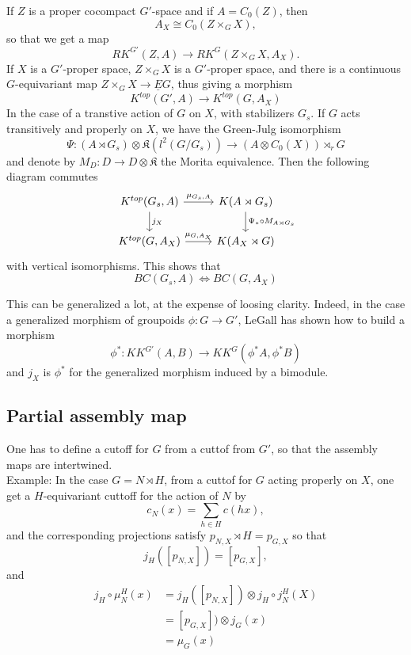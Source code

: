 If $Z$ is a proper cocompact $G'$-space and if $A=C_0(Z)$, then 
\[A_X \cong C_0(Z\times_G X ),\]
so that we get a map
\[RK^{G'}(Z, A) \rightarrow RK^G(Z\times_G X,A_X).\]
If $X$ is a $G'$-proper space, $Z\times_G X$ is a $G'$-proper space, and there is a continuous $G$-equivariant map $Z\times_G X \rightarrow \underline E G$, thus giving a morphism
\[ K^{top}(G',A) \rightarrow K^{top}(G,A_X)  \]
In the case of a transtive action of $G$ on $X$, with stabilizers $G_s$. If $G$ acts transitively and properly on $X$, we have the Green-Julg isomorphism 
\[\Psi :(A\rtimes G_s)\otimes \mathfrak K(l^2(G/G_s))\rightarrow  (A\otimes C_0(X)) \rtimes_r G \]
and denote by $M_D: D\rightarrow D\otimes \mathfrak K$ the Morita equivalence. Then the following diagram commutes
\[\begin{tikzcd}
K^{top}(G_s, A) \arrow{d}{j_X} \arrow{r}{\mu_{G_s,A}} & K(A\rtimes G_s) \arrow{d}{\Psi_* \circ M_{A\rtimes G_s}}\\ 
K^{top}(G,A_X)\arrow{r}{\mu_{G,A_X}} & K(A_X\rtimes G)
\end{tikzcd}\]
with vertical isomorphisms. This shows that 
\[BC(G_s, A) \iff BC(G,A_X)\] 

This can be generalized a lot, at the expense of loosing clarity. Indeed, in the case a generalized morphism of groupoids $\phi : G \rightarrow G'$, LeGall has shown \cite{} how to build a morphism
\[\phi^* : KK^{G'}(A,B) \rightarrow KK^G(\phi^* A, \phi^* B)\] 
and $j_X$ is $\phi^*$ for the generalized morphism induced by a bimodule. 

\subsection{Partial assembly map}

One has to define a cutoff for $G$ from a cuttof from $G'$, so that the assembly maps are intertwined.\\

Example: In the case $G=N\rtimes H$, from a cuttof for $G$ acting properly on $X$, one get a $H$-equivariant cuttoff for the action of $N$ by 
\[c_N (x) =\sum_{h\in H} c(hx),\]
and the corresponding projections satisfy $p_{N,X} \rtimes H = p_{G,X}$ so that 
\[ j_H([p_{N,X}]) = [p_{G,X}],\]
and
\[\begin{split}
j_H \circ\mu_N^H(x) & = j_H([p_{N,X}]) \otimes j_H\circ j^H_N(X) \\
			& = [p_{G,X}]) \otimes j_G(x)\\
			&= \mu_G(x)\\
\end{split}\]
\newpage

